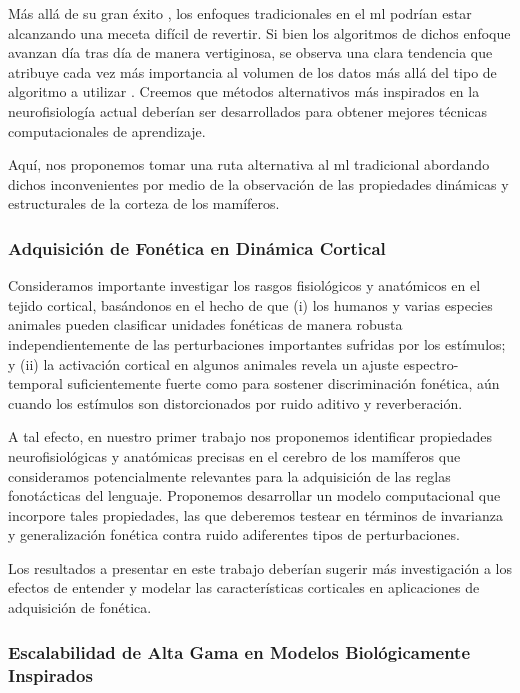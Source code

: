 Más allá de su gran éxito \cite{lecun_deep_2015}, los enfoques tradicionales en el \gls{ml} podrían estar alcanzando una meceta difícil de revertir.
Si bien los algoritmos de dichos enfoque avanzan día tras día de manera vertiginosa, se observa una clara tendencia que atribuye cada vez más importancia al volumen de los datos más allá del tipo de algoritmo a utilizar \cite{PPR:PPR91722}.
Creemos que métodos alternativos más inspirados en la neurofisiología actual deberían ser desarrollados para obtener mejores técnicas computacionales de aprendizaje.

Aquí, nos proponemos tomar una ruta alternativa al \gls{ml} tradicional abordando dichos inconvenientes por medio de la observación de las propiedades dinámicas y estructurales de la corteza de los mamíferos.


\subsubsection{Adquisición de Fonética en Dinámica Cortical}

Consideramos importante investigar los rasgos fisiológicos y anatómicos en el tejido cortical,
basándonos en el hecho de que (i) los humanos y varias especies animales pueden clasificar unidades fonéticas de manera robusta independientemente de las perturbaciones importantes sufridas por los estímulos; y (ii) la activación cortical en algunos animales revela un ajuste espectro-temporal suficientemente fuerte como para sostener discriminación fonética, aún cuando los estímulos son distorcionados por ruido aditivo y reverberación.

A tal efecto, en nuestro primer trabajo nos proponemos identificar propiedades neurofisiológicas y anatómicas precisas en el cerebro de los mamíferos que consideramos potencialmente relevantes para la adquisición de las reglas fonotácticas del lenguaje.
Proponemos desarrollar un modelo computacional que incorpore tales propiedades, las que deberemos testear en términos de invarianza y generalización fonética contra ruido adiferentes tipos de perturbaciones.

Los resultados a presentar en este trabajo deberían sugerir más investigación a los efectos de entender y modelar las características corticales en aplicaciones de adquisición de fonética.




\subsubsection{Escalabilidad de Alta Gama en Modelos Biológicamente Inspirados}

